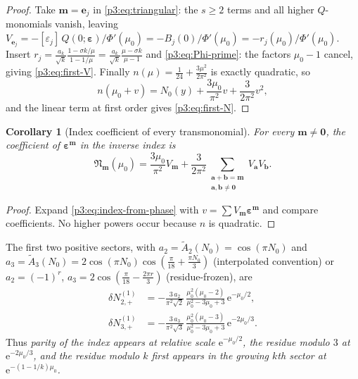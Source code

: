\documentclass[11pt,a4paper,oneside]{book}
\theoremstyle{plain}
\newtheorem{corollary}[theorem]{Corollary}
\theoremstyle{definition}
\theoremstyle{remark}
\newcommand{\e}{\mathrm{e}}
\newcommand{\Coef}[1]{[#1]\,}
\begin{document}
\begin{proof}
Take $\boldsymbol m=\boldsymbol e_{j}$ in \cref{p3:eq:triangular}: the $s\ge2$ terms and all
higher $Q$-monomials vanish, leaving $V_{\boldsymbol
e_{j}}=-\Coef{\varepsilon_{j}}Q(0;\boldsymbol\varepsilon)/\Phi'(\mu_{0})
=-B_{j}(0)/\Phi'(\mu_{0})=-r_{j}(\mu_{0})/\Phi'(\mu_{0})$. Insert $r_{j}=\frac{a_{k}}{\sqrt
k}\frac{1-\sigma k/\mu}{1-1/\mu} =\frac{a_{k}}{\sqrt k}\frac{\mu-\sigma k}{\mu-1}$ and
\cref{p3:eq:Phi-prime}: the factors $\mu_{0}-1$ cancel, giving \cref{p3:eq:first-V}. Finally
$n(\mu)=\frac1{24}+\frac{3\mu^{2}}{2\pi^{2}}$ is exactly quadratic, so
\begin{equation}\label{p3:eq:index-from-phase}
 n(\mu_{0}+v)=N_{0}(y)+\frac{3\mu_{0}}{\pi^{2}}v+\frac3{2\pi^{2}}v^{2},
\end{equation}
and the linear term at first order gives \cref{p3:eq:first-N}.
\end{proof}

\begin{corollary}[Index coefficient of every transmonomial]\label{p3:cor:N-multi}
For every $\boldsymbol m\ne\boldsymbol0$, the coefficient of $\boldsymbol\varepsilon^{\boldsymbol
m}$ in the inverse index is
\begin{equation}\label{p3:eq:N-multi}
 \mathfrak N_{\boldsymbol m}(\mu_{0})=\frac{3\mu_{0}}{\pi^{2}}V_{\boldsymbol m}
 +\frac3{2\pi^{2}}\sum_{\substack{\boldsymbol a+\boldsymbol b=\boldsymbol m\\ \boldsymbol a,\boldsymbol b\ne\boldsymbol0}}
 V_{\boldsymbol a}V_{\boldsymbol b} .
\end{equation}
\end{corollary}

\begin{proof}
Expand \cref{p3:eq:index-from-phase} with $v=\sum V_{\boldsymbol m}
\boldsymbol\varepsilon^{\boldsymbol m}$ and compare coefficients. No higher powers occur because
$n$ is quadratic.
\end{proof}

The first two positive sectors, with $a_{2}=\widetilde A_{2}(N_{0})=\cos(\pi N_{0})$ and
$a_{3}=\widetilde A_{3}(N_{0})=2\cos(\pi N_{0})\cos(\tfrac\pi{18}+\tfrac{\pi N_{0}}3)$
(interpolated convention) or $a_{2}=(-1)^{r}$, $a_{3}=2\cos(\tfrac\pi{18}-\tfrac{2\pi r}3)$
(residue-frozen), are
\begin{align}
 \delta N^{(1)}_{2,+}
 &=-\frac{3\,a_{2}}{\pi^{2}\sqrt2}\,
 \frac{\mu_{0}^{2}(\mu_{0}-2)}{\mu_{0}^{2}-3\mu_{0}+3}\,\e^{-\mu_{0}/2},
 \label{p3:eq:dN2}\\
 \delta N^{(1)}_{3,+}
 &=-\frac{3\,a_{3}}{\pi^{2}\sqrt3}\,
 \frac{\mu_{0}^{2}(\mu_{0}-3)}{\mu_{0}^{2}-3\mu_{0}+3}\,\e^{-2\mu_{0}/3}.
 \label{p3:eq:dN3}
\end{align}
Thus \emph{parity of the index appears at relative scale $\e^{-\mu_{0}/2}$, the residue modulo $3$
at $\e^{-2\mu_{0}/3}$, and the residue modulo $k$ first appears in the growing $k$th sector at
$\e^{-(1-1/k)\mu_{0}}$.}
\end{document}
